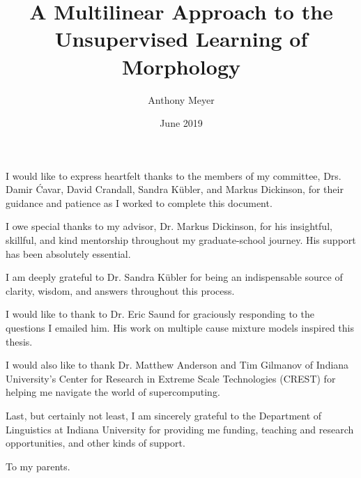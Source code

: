 \documentclass[showabstract,showacknowledgments,showdedication]{iuphd}
\title{A Multilinear Approach to the Unsupervised Learning of Morphology}
\author{Anthony Meyer}
\date{June 2019} %
\theoremstyle{remark}
\theoremstyle{remark}
\theoremstyle{remark}
\theoremstyle{remark}
\begin{document}
\maketitle
\acceptancepage

\copyrightpage



\begin{acknowledgments}
I would like to express heartfelt thanks to the members of my committee, Drs. Damir \'{C}avar, David Crandall, Sandra K\"{u}bler, and Markus Dickinson, for their guidance and patience as I worked to complete this document. 

I owe special thanks to my advisor, Dr. Markus Dickinson, for his insightful, skillful, and kind mentorship throughout my graduate-school journey. His support has been absolutely essential.

I am deeply grateful to Dr. Sandra K\"{u}bler for being an indispensable source of clarity, wisdom, and answers throughout this process.

I would like to thank to Dr. Eric Saund for graciously responding to the questions I emailed him. His work on multiple cause mixture models inspired this thesis.

I would also like to thank Dr. Matthew Anderson and Tim Gilmanov of Indiana University’s Center for Research in Extreme Scale Technologies (CREST) for helping me navigate the world of supercomputing.

Last, but certainly not least, I am sincerely grateful to the Department of Linguistics at Indiana University for providing me funding, teaching and research opportunities, and other kinds of support.
\end{acknowledgments}


\begin{dedication}
To my parents.
\end{dedication}



\end{document}
